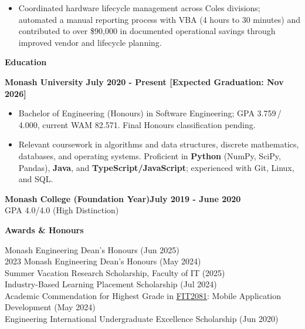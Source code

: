 \documentclass[11pt, a4paper]{article}
\let\hrefnoul\href
\renewcommand{\href}[2]{\hrefnoul{#1}{\ul{#2}}}
\newcommand{\resumesection}[1]{%
  \vspace{6pt}\par
  {\setlength{\fboxsep}{5pt}%
   \noindent\colorbox{sectionbg}{%
     \parbox{\dimexpr\linewidth-10pt\relax}{\strut\textbf{\large #1}\strut}%
   }}%
  \vspace{2pt}\par
}
\begin{document}
\begin{itemize}[leftmargin=1.5em, itemsep=2pt, topsep=1pt, parsep=0pt]
  \item Coordinated hardware lifecycle management across Coles divisions; automated a manual
        reporting process with VBA (4 hours to 30 minutes) and contributed to over \$90,000 in
        documented operational savings through improved vendor and lifecycle planning.
\end{itemize}

\resumesection{Education}

\noindent\textbf{Monash University}%
\hfill\textbf{July 2020 - Present [Expected Graduation: Nov 2026]}

\begin{itemize}[leftmargin=1.5em, itemsep=2pt, topsep=1pt, parsep=0pt]
  \item Bachelor of Engineering (Honours) in Software Engineering; GPA 3.759\,/\,4.000,
        current WAM 82.571. Final Honours classification pending.

  \item Relevant coursework in algorithms and data structures, discrete mathematics, databases,
        and operating systems. Proficient in \textbf{Python} (NumPy, SciPy, Pandas), \textbf{Java},
        and \textbf{TypeScript/JavaScript}; experienced with Git, Linux, and SQL.
\end{itemize}

\vspace{3pt}
\noindent\textbf{Monash College (Foundation Year)}\hfill\textbf{July 2019 - June 2020}\\
GPA 4.0/4.0 (High Distinction)

\resumesection{Awards \& Honours}

\vspace{3pt}
 Monash Engineering Dean's Honours (Jun 2025)\\
2023 Monash Engineering Dean's Honours (May 2024)\\
Summer Vacation Research Scholarship, Faculty of IT (2025)\\
Industry-Based Learning Placement Scholarship (Jul 2024)\\
Academic Commendation for Highest Grade in
\href{https://handbook.monash.edu/2024/units/FIT2081}{FIT2081}:
Mobile Application Development (May 2024)\\
Engineering International Undergraduate Excellence Scholarship (Jun 2020)
\end{document}
